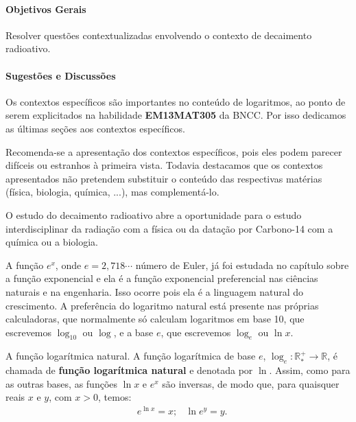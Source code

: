\begin{texto}
{\def\currentcolor{session4}
\setlength\parskip{5pt}
	\paragraph{Objetivos Gerais}
	Resolver questões contextualizadas envolvendo o contexto de decaimento radioativo.

	\paragraph{Sugestões e Discussões}
	Os contextos específicos são importantes no conteúdo de logaritmos, ao ponto de serem explicitados na habilidade \textbf{EM13MAT305} da BNCC. Por isso dedicamos as últimas seções aos contextos específicos.

	Recomenda-se a apresentação dos contextos específicos, pois eles podem parecer difíceis ou estranhos à primeira vista. Todavia destacamos que os contextos apresentados não pretendem substituir o conteúdo das respectivas matérias (física, biologia, química, ...), mas complementá-lo.

	O estudo do decaimento radioativo abre a oportunidade para o estudo interdisciplinar da radiação com a física ou da datação por Carbono-14 com a química ou a biologia.

}
\end{texto}



A função $e^x$, onde $e=2{,}718\cdots$ número de Euler, já foi estudada no capítulo sobre a função exponencial e ela é a função exponencial preferencial nas ciências naturais e na engenharia. Isso ocorre pois ela é a linguagem natural do crescimento. A preferência do logaritmo natural está presente nas próprias calculadoras, que normalmente só calculam logaritmos em base 10, que escrevemos $\log_{10}$ ou $\log$, e a base $e$, que escrevemos $\log_e$ ou $\ln x$.

\begin{observation}{A função logarítmica natural.}
A função logarítmica de base $e$, $\log_e: \mathbb{R}^+_* \to \mathbb{R}$, é chamada de \textbf{função logarítmica natural} e denotada por $\ln$. Assim, como para as outras bases, as funções $\ln x$ e $e^x$ são inversas, de modo que, para quaisquer reais $x$ e $y$, com $x>0$, temos:
\begin{align*}
& e^{\ln x} = x;
& \ln e^y = y.
\end{align*}
\end{observation}

